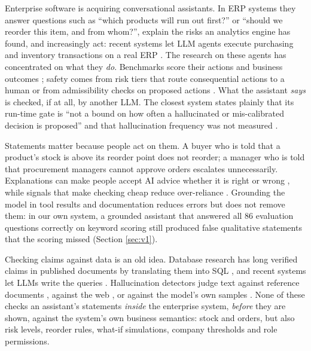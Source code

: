 \documentclass[journal]{IEEEtran}
\begin{document}
Enterprise software is acquiring conversational assistants. In ERP systems they answer questions such as
``which products will run out first?'' or ``should we reorder this item, and from whom?'', explain the
risks an analytics engine has found, and increasingly act: recent systems let LLM agents execute purchasing
and inventory transactions on a real ERP \cite{liu2026agenticerp, yang2025finrobot}. The research on these
agents has concentrated on what they \emph{do}. Benchmarks score their actions and business outcomes
\cite{zhang2026erpbench, vishwakarma2025enterprisebench, han2026cfo}; safety comes from risk tiers that
route consequential actions to a human \cite{liu2026agenticerp} or from admissibility checks on proposed
actions \cite{misra2026admitbench}. What the assistant \emph{says} is checked, if at all, by another LLM.
The closest system states plainly that its run-time gate is ``not a bound on how often a hallucinated or
mis-calibrated decision is proposed'' and that hallucination frequency was not measured
\cite{liu2026agenticerp}.

Statements matter because people act on them. A buyer who is told that a product's stock is above its
reorder point does not reorder; a manager who is told that procurement managers cannot approve orders
escalates unnecessarily. Explanations can make people accept AI advice whether it is right or wrong
\cite{bansal2021whole}, while signals that make checking cheap reduce over-reliance
\cite{vasconcelos2023overreliance}. Grounding the model in tool results and documentation reduces errors
but does not remove them: in our own system, a grounded assistant that answered all 86 evaluation questions
correctly on keyword scoring still produced false qualitative statements that the scoring missed (Section
\ref{sec:v1}).

Checking claims against data is an old idea. Database research has long verified claims in published
documents by translating them into SQL \cite{jo2019aggchecker, karagiannis2020scrutinizer}, and recent
systems let LLMs write the queries \cite{jayasekara2025cedar, theologitis2025thucy}. Hallucination
detectors judge text against reference documents \cite{tang2024minicheck, niu2024ragtruth}, against the web
\cite{wei2024longform}, or against the model's own samples \cite{manakul2023selfcheckgpt,
farquhar2024semantic}. None of these checks an assistant's statements \emph{inside} the enterprise system,
\emph{before} they are shown, against the system's own business semantics: stock and orders, but also risk
levels, reorder rules, what-if simulations, company thresholds and role permissions.
\end{document}
